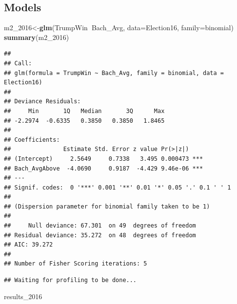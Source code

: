 \documentclass[]{article}
\newenvironment{Shaded}{\begin{snugshade}}{\end{snugshade}}
\newcommand{\CommentTok}[1]{\textcolor[rgb]{0.56,0.35,0.01}{\textit{#1}}}
\newcommand{\DataTypeTok}[1]{\textcolor[rgb]{0.13,0.29,0.53}{#1}}
\newcommand{\DecValTok}[1]{\textcolor[rgb]{0.00,0.00,0.81}{#1}}
\newcommand{\KeywordTok}[1]{\textcolor[rgb]{0.13,0.29,0.53}{\textbf{#1}}}
\newcommand{\NormalTok}[1]{#1}
\newcommand{\OperatorTok}[1]{\textcolor[rgb]{0.81,0.36,0.00}{\textbf{#1}}}
\begin{document}
\hypertarget{models}{%
\subsection{Models}\label{models}}

\begin{Shaded}
\begin{Highlighting}[]
\NormalTok{m2_}\DecValTok{2016}\NormalTok{<-}\KeywordTok{glm}\NormalTok{(TrumpWin}\OperatorTok{~}\NormalTok{Bach_Avg, }\DataTypeTok{data=}\NormalTok{Election16, }\DataTypeTok{family=}\NormalTok{binomial)}
\KeywordTok{summary}\NormalTok{(m2_}\DecValTok{2016}\NormalTok{)}
\end{Highlighting}
\end{Shaded}

\begin{verbatim}
## 
## Call:
## glm(formula = TrumpWin ~ Bach_Avg, family = binomial, data = Election16)
## 
## Deviance Residuals: 
##     Min       1Q   Median       3Q      Max  
## -2.2974  -0.6335   0.3850   0.3850   1.8465  
## 
## Coefficients:
##               Estimate Std. Error z value Pr(>|z|)    
## (Intercept)     2.5649     0.7338   3.495 0.000473 ***
## Bach_AvgAbove  -4.0690     0.9187  -4.429 9.46e-06 ***
## ---
## Signif. codes:  0 '***' 0.001 '**' 0.01 '*' 0.05 '.' 0.1 ' ' 1
## 
## (Dispersion parameter for binomial family taken to be 1)
## 
##     Null deviance: 67.301  on 49  degrees of freedom
## Residual deviance: 35.272  on 48  degrees of freedom
## AIC: 39.272
## 
## Number of Fisher Scoring iterations: 5
\end{verbatim}

\begin{Shaded}
\end{Shaded}

\begin{verbatim}
## Waiting for profiling to be done...
\end{verbatim}

\begin{Shaded}
\begin{Highlighting}[]
\NormalTok{results_}\DecValTok{2016}
\end{Highlighting}
\end{Shaded}
\end{document}

